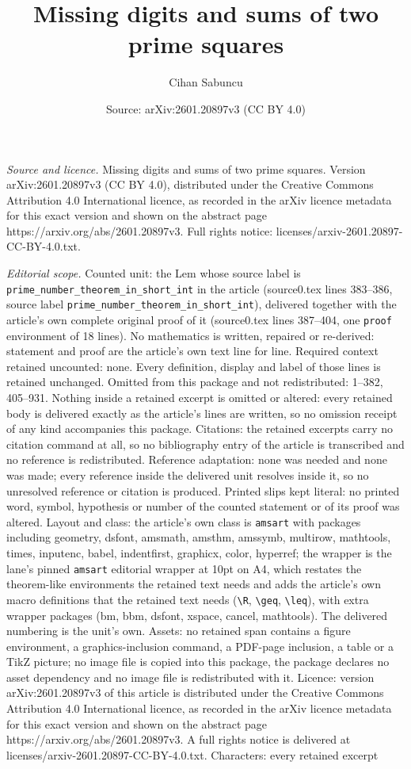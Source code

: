 \documentclass[10pt,a4paper]{amsart}
\title[Missing digits and sums of two prime squares]{Missing digits and sums of two prime squares}
\author{Cihan Sabuncu}
\date{Source: arXiv:2601.20897v3 (CC BY 4.0)}
\begin{document}
\maketitle

\noindent\emph{Source and licence.} Missing digits and sums of two prime squares. Version arXiv:2601.20897v3 (CC BY 4.0), distributed under the Creative Commons Attribution 4.0 International licence, as recorded in the arXiv licence metadata for this exact version and shown on the abstract page https://arxiv.org/abs/2601.20897v3. Full rights notice: licenses/arxiv-2601.20897-CC-BY-4.0.txt.\par\smallskip

\noindent\textit{Editorial scope.} Counted unit: the Lem whose source label is \texttt{prime\_number\_theorem\_in\_short\_int} in the article (source0.tex lines 383--386, source label \texttt{prime\_number\_theorem\_in\_short\_int}), delivered together with the article's own complete original proof of it (source0.tex lines 387--404, one \texttt{proof} environment of 18 lines). No mathematics is written, repaired or re-derived: statement and proof are the article's own text line for line. Required context retained uncounted: none. Every definition, display and label of those lines is retained unchanged. Omitted from this package and not redistributed: 1--382, 405--931. Nothing inside a retained excerpt is omitted or altered: every retained body is delivered exactly as the article's lines are written, so no omission receipt of any kind accompanies this package. Citations: the retained excerpts carry no citation command at all, so no bibliography entry of the article is transcribed and no reference is redistributed. Reference adaptation: none was needed and none was made; every reference inside the delivered unit resolves inside it, so no unresolved reference or citation is produced. Printed slips kept literal: no printed word, symbol, hypothesis or number of the counted statement or of its proof was altered. Layout and class: the article's own class is \texttt{amsart} with packages including geometry, dsfont, amsmath, amsthm, amssymb, multirow, mathtools, times, inputenc, babel, indentfirst, graphicx, color, hyperref; the wrapper is the lane's pinned \texttt{amsart} editorial wrapper at 10pt on A4, which restates the theorem-like environments the retained text needs and adds the article's own macro definitions that the retained text needs (\texttt{\textbackslash R}, \texttt{\textbackslash geq}, \texttt{\textbackslash leq}), with extra wrapper packages (bm, bbm, dsfont, xspace, cancel, mathtools). The delivered numbering is the unit's own. Assets: no retained span contains a figure environment, a graphics-inclusion command, a PDF-page inclusion, a table or a TikZ picture; no image file is copied into this package, the package declares no asset dependency and no image file is redistributed with it. Licence: version arXiv:2601.20897v3 of this article is distributed under the Creative Commons Attribution 4.0 International licence, as recorded in the arXiv licence metadata for this exact version and shown on the abstract page https://arxiv.org/abs/2601.20897v3. A full rights notice is delivered at licenses/arxiv-2601.20897-CC-BY-4.0.txt. Characters: every retained excerpt 
\end{document}
